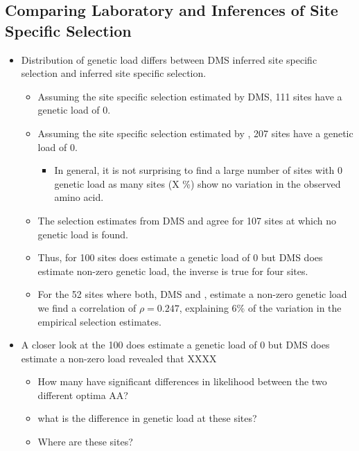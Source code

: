 \documentclass[12pt]{article}
\begin{document}
\subsection*{Comparing Laboratory and \selac Inferences of Site Specific Selection}
\begin{itemize}
	\item Distribution of genetic load differs between DMS inferred site specific selection and \selac inferred site specific selection.
	\begin{itemize}
		\item Assuming the site specific selection estimated by DMS, 111 sites have a genetic load of 0.
		\item Assuming the site specific selection estimated by \selac, 207 sites have a genetic load of 0.
		\begin{itemize}
			\item In general, it is not surprising to find a large number of sites with 0 genetic load as many sites (X \%) show no variation in the observed amino acid.
		\end{itemize}
		\item The selection estimates from DMS and \selac agree for 107 sites at which no genetic load is found.
		\item Thus, for 100 sites \selac does estimate a genetic load of 0 but DMS does estimate non-zero genetic load, the inverse is true for four sites.
		\item For the 52 sites where both, DMS and \selac, estimate a non-zero genetic load we find a correlation of $\rho = 0.247$, explaining $6 \%$ of the variation in the empirical selection estimates.
	\end{itemize}
	\item A closer look at the 100 \selac does estimate a genetic load of 0 but DMS does estimate a non-zero load revealed that XXXX
	\begin{itemize}
	 \item How many have significant differences in likelihood between the two different optima AA?
	 \item what is the difference in genetic load at these sites?
	 \item Where are these sites?
	\end{itemize}
\end{itemize}
\end{document}
